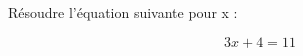 \documentclass{article}
\begin{document}
Résoudre l'équation suivante pour x :

\[3x + 4 = 11\]
\end{document}
